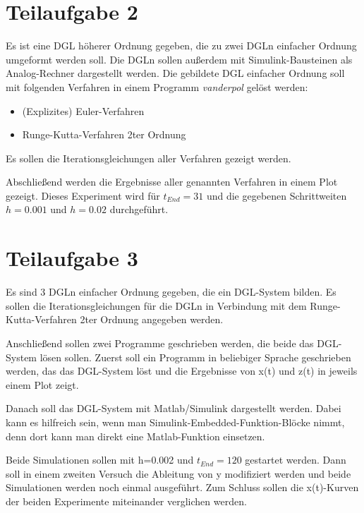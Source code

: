 \documentclass[]{scrartcl}
\begin{document}
\section{Teilaufgabe 2}
Es ist eine DGL höherer Ordnung gegeben, die zu zwei DGLn einfacher Ordnung umgeformt werden soll. Die DGLn sollen außerdem mit Simulink-Bausteinen als Analog-Rechner dargestellt werden. Die gebildete DGL einfacher Ordnung soll mit folgenden Verfahren in einem Programm \textit{vanderpol} gelöst werden:

\begin{itemize}
	\item (Explizites) Euler-Verfahren
	\item Runge-Kutta-Verfahren 2ter Ordnung
\end{itemize}

Es sollen die Iterationsgleichungen aller Verfahren gezeigt werden.

Abschließend werden die Ergebnisse aller genannten Verfahren in einem Plot gezeigt. Dieses Experiment wird für $t_{End} = 31$ und die gegebenen Schrittweiten $h=0.001$ und $h=0.02$ durchgeführt.

\section{Teilaufgabe 3}
Es sind 3 DGLn einfacher Ordnung gegeben, die ein DGL-System bilden. Es sollen die Iterationsgleichungen für die DGLn in Verbindung mit dem Runge-Kutta-Verfahren 2ter Ordnung angegeben werden.

Anschließend sollen zwei Programme geschrieben werden, die beide das DGL-System lösen sollen. Zuerst soll ein Programm in beliebiger Sprache geschrieben werden, das das DGL-System löst und die Ergebnisse von x(t) und z(t) in jeweils einem Plot zeigt.

Danach soll das DGL-System mit Matlab/Simulink dargestellt werden. Dabei kann es hilfreich sein, wenn man Simulink-Embedded-Funktion-Blöcke nimmt, denn dort kann man direkt eine Matlab-Funktion einsetzen.

Beide Simulationen sollen mit h=0.002 und $t_{End}=120$ gestartet werden. Dann soll in einem zweiten Versuch die Ableitung von y modifiziert werden und beide Simulationen werden noch einmal ausgeführt. Zum Schluss sollen die x(t)-Kurven der beiden Experimente miteinander verglichen werden.
\end{document}
